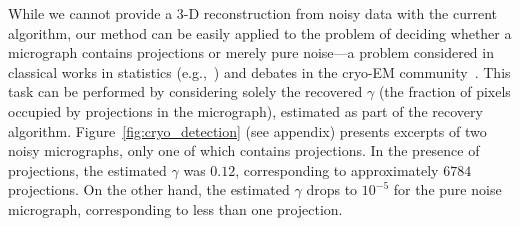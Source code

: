 \documentclass[9pt,twocolumn,twoside,lineno]{pnas-new}
\begin{document}
While we cannot provide a 3-D reconstruction from noisy data with the current algorithm, our method can be easily applied to the problem of deciding whether a micrograph contains projections or merely pure noise---a problem considered in classical works in statistics (e.g.,~\cite{donoho2004higher}) and debates in the cryo-EM community~\cite{henderson2013avoiding}.
This task can be performed by considering solely the recovered $\gamma$ (the fraction of pixels occupied by projections in the micrograph), estimated as part of the recovery algorithm.
Figure~\ref{fig:cryo_detection} (see appendix) presents excerpts  of two noisy micrographs, only one of which contains projections.
In the presence of projections, the estimated $\gamma$ was $0.12$, corresponding to approximately $6784$ projections. 
On the other hand, the estimated $\gamma$ drops to $10^{-5}$ for the pure noise micrograph, corresponding to less than one projection.
\end{document}
